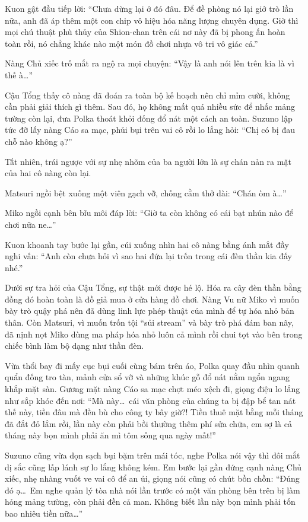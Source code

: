 \documentclass[../main.tex]{subfiles}
\begin{document}
Kuon gật đầu tiếp lời: ``Chưa dừng lại ở đó đâu. Để đề phòng nó lại giở trò lần nữa, anh đã áp thêm một con chip vô hiệu hóa năng lượng chuyên dụng. Giờ thì mọi chú thuật phù thủy của Shion-chan trên cái nơ này đã bị phong ấn hoàn toàn rồi, nó chẳng khác nào một món đồ chơi nhựa vô tri vô giác cả.''

Nàng Chủ xiếc trố mắt ra ngộ ra mọi chuyện: ``Vậy là anh nói lên trên kia là vì thế à\dots''

Cậu Tổng thấy cô nàng đã đoán ra toàn bộ kế hoạch nên chỉ mỉm cười, không cần phải giải thích gì thêm. Sau đó, họ không mất quá nhiều sức để nhấc mảng tường còn lại, đưa Polka thoát khỏi đống đổ nát một cách an toàn. Suzuno lập tức đỡ lấy nàng Cáo sa mạc, phủi bụi trên vai cô rồi lo lắng hỏi: ``Chị có bị đau chỗ nào không ạ?''

Tất nhiên, trái ngược với sự nhẹ nhõm của ba người lớn là sự chán nản ra mặt của hai cô nàng còn lại.

Matsuri ngồi bệt xuống một viên gạch vỡ, chống cằm thở dài: ``Chán òm à\dots''

Miko ngồi cạnh bên bĩu môi đáp lời: ``Giờ ta còn không có cái bạt nhún nào để chơi nữa ne\dots''

Kuon khoanh tay bước lại gần, cúi xuống nhìn hai cô nàng bằng ánh mắt đầy nghi vấn: ``Anh còn chưa hỏi vì sao hai đứa lại trốn trong cái đèn thần kia đấy nhé.''

Dưới sự tra hỏi của Cậu Tổng, sự thật mới được hé lộ. Hóa ra cây đèn thần bằng đồng đó hoàn toàn là đồ giả mua ở cửa hàng đồ chơi. Nàng Vu nữ Miko vì muốn bày trò quậy phá nên đã dùng linh lực phép thuật của mình để tự hóa nhỏ bản thân. Còn Matsuri, vì muốn trốn tội ``sủi stream'' và bày trò phá đám ban nãy, đã nịnh nọt Miko dùng ma pháp hóa nhỏ luôn cả mình rồi chui tọt vào bên trong chiếc bình làm bộ dạng như thần đèn.

Vừa thổi bay đi mấy cục bụi cuối cùng bám trên áo, Polka quay đầu nhìn quanh quẩn đống tro tàn, mảnh cửa sổ vỡ và những khúc gỗ đổ nát nằm ngổn ngang khắp mặt sàn. Gương mặt nàng Cáo sa mạc chợt méo xệch đi, giọng điệu lo lắng như sắp khóc đến nơi: ``Mà này\dots\ cái văn phòng của chúng ta bị đập bể tan nát thế này, tiền đâu mà đền bù cho công ty bây giờ?! Tiền thuê mặt bằng mỗi tháng đã đắt đỏ lắm rồi, lần này còn phải bồi thường thêm phí sửa chữa, em sợ là cả tháng này bọn mình phải ăn mì tôm sống qua ngày mất!''

Suzuno cũng vừa dọn sạch bụi bặm trên mái tóc, nghe Polka nói vậy thì đôi mắt dị sắc cũng lấp lánh sự lo lắng không kém. Em bước lại gần đứng cạnh nàng Chủ xiếc, nhẹ nhàng vuốt ve vai cô để an ủi, giọng nói cũng có chút bồn chồn: ``Đúng đó ạ\dots\ Em nghe quản lý tòa nhà nói lần trước có một văn phòng bên trên bị làm hỏng mảng tường, còn phải đền cả man. Không biết lần này bọn mình phải tốn bao nhiêu tiền nữa\dots''
\end{document}
